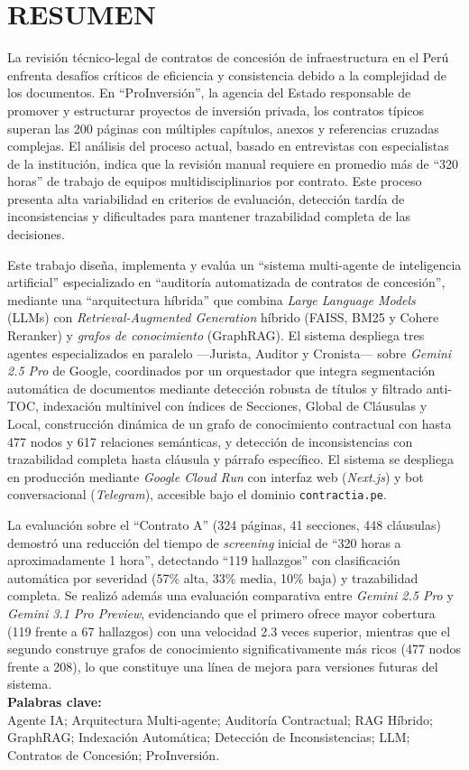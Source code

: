 \chapter*{\center \Large \vspace{-4.5cm} RESUMEN}
\noindent

La revisión técnico-legal de contratos de concesión de infraestructura en el Perú 
enfrenta desafíos críticos de eficiencia y consistencia debido a la complejidad de 
los documentos. En \enquote{ProInversión}, la agencia del Estado responsable de 
promover y estructurar proyectos de inversión privada, los contratos típicos superan 
las 200 páginas con múltiples capítulos, anexos y referencias cruzadas complejas. 
El análisis del proceso actual, basado en entrevistas con especialistas de la 
institución, indica que la revisión manual requiere en promedio más de 
\enquote{320 horas} de trabajo de equipos multidisciplinarios por contrato. Este 
proceso presenta alta variabilidad en criterios de evaluación, detección tardía de 
inconsistencias y dificultades para mantener trazabilidad completa de las decisiones.

Este trabajo diseña, implementa y evalúa un \enquote{sistema multi-agente de 
inteligencia artificial} especializado en \enquote{auditoría automatizada de contratos 
de concesión}, mediante una \enquote{arquitectura híbrida} que combina \textit{Large 
Language Models} (LLMs) con \textit{Retrieval-Augmented Generation} híbrido (FAISS, 
BM25 y Cohere Reranker) y \textit{grafos de conocimiento} (GraphRAG). El sistema 
despliega tres agentes especializados en paralelo —Jurista, Auditor y Cronista— sobre 
\textit{Gemini 2.5 Pro} de Google, coordinados por un orquestador que integra 
segmentación automática de documentos mediante detección robusta de títulos y filtrado 
anti-TOC, indexación multinivel con índices de Secciones, Global de Cláusulas y Local, 
construcción dinámica de un grafo de conocimiento contractual con hasta 477 nodos y 
617 relaciones semánticas, y detección de inconsistencias con trazabilidad completa 
hasta cláusula y párrafo específico. El sistema se despliega en producción mediante 
\textit{Google Cloud Run} con interfaz web (\textit{Next.js}) y bot conversacional 
(\textit{Telegram}), accesible bajo el dominio \texttt{contractia.pe}.

La evaluación sobre el \enquote{Contrato A} (324 
páginas, 41 secciones, 448 cláusulas) demostró una reducción del tiempo de 
\textit{screening} inicial de \enquote{320 horas a aproximadamente 1 hora}, detectando 
\enquote{119 hallazgos} con clasificación automática por severidad (57\% alta, 33\% 
media, 10\% baja) y trazabilidad completa. Se realizó además una evaluación comparativa 
entre \textit{Gemini 2.5 Pro} y \textit{Gemini 3.1 Pro Preview}, evidenciando que 
el primero ofrece mayor cobertura (119 frente a 67 hallazgos) con una velocidad 2.3 
veces superior, mientras que el segundo construye grafos de conocimiento 
significativamente más ricos (477 nodos frente a 208), lo que constituye una línea 
de mejora para versiones futuras del sistema. \\

\noindent \textbf{Palabras clave:}\\
\noindent Agente IA; Arquitectura Multi-agente; Auditoría Contractual; RAG Híbrido; 
GraphRAG; Indexación Automática; Detección de Inconsistencias; LLM; Contratos de 
Concesión; ProInversión.